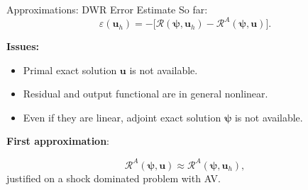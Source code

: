\documentclass{beamer}
\newcounter{sectionframecount}
\begin{document}
\begin{frame}[t]{Approximations: DWR Error Estimate}
  So far:
  \begin{equation}
    \varepsilon(\boldsymbol{u}_h) = -\Big[\mathcal{R}(\boldsymbol{\psi},\boldsymbol{u}_h) - \mathcal{R}^A(\boldsymbol{\psi},\boldsymbol{u})\Big].
  \end{equation}

  \textbf{Issues:}

\begin{itemize}
  \item Primal exact solution $\boldsymbol{u}$ is not available.
  \item Residual and output functional are in general nonlinear.
  \item Even if they are linear, adjoint exact solution $\boldsymbol{\psi}$ is not available.
\end{itemize}

\vspace{10pt}
\textbf{First approximation}:

  \begin{equation}
    \mathcal{R}^A(\boldsymbol{\psi},\boldsymbol{u}) \approx
    \mathcal{R}^A(\boldsymbol{\psi},\boldsymbol{u}_h),
  \end{equation}
  justified on a shock dominated problem with AV.

\end{frame}

\end{document}
